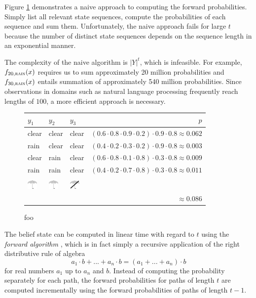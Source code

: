 Figure \ref{fw-naive-prob} demonstrates a naive
approach to computing the forward probabilities. Simply list all
relevant state sequences, compute the probabilities of each sequence
and sum them. Unfortunately, the naive approach fails for large
$t$ because the number of distinct state sequences depends on the sequence length in an exponential manner. 

The complexity of the naive algorithm is $|Y|^t$, which is infeasible.
For example, $f_{20,\textsc{rain}}(x)$ requires us to sum
approximately 20 million probabilities and $f_{30,\textsc{rain}}(x)$
entails summation of approximately 540 million probabilities. Since
observations in domains such as natural language processing frequently
reach lengths of $100$, a more efficient approach is necessary.

\begin{figure}[!ftb]
\begin{center}
\caption{foo}\label{fw-naive-prob}
\begin{tabular}{lllr}
$y_1$ & $y_2$ & $y_3$ & $p$ \\
\hline
{\sc clear} & {\sc clear} & {\sc clear} & $(0.6\cdot0.8\cdot0.9\cdot0.2)\cdot0.9\cdot0.8\approx0.062$\\
{\sc rain}  & {\sc clear} & {\sc clear} & $(0.4\cdot0.2\cdot0.3\cdot0.2)\cdot0.9\cdot0.8\approx0.003$\\
{\sc clear} & {\sc rain}  & {\sc clear} & $(0.6\cdot0.8\cdot0.1\cdot0.8)\cdot0.3\cdot0.8\approx0.009$\\
{\sc rain}  & {\sc rain}  & {\sc clear} & $(0.4\cdot0.2\cdot0.7\cdot0.8)\cdot0.3\cdot0.8\approx0.011$\\
& & & \\
\includegraphics[width=0.5cm]{umbrella} & \includegraphics[width=0.5cm]{umbrella} & \includegraphics[width=0.5cm]{no_umbrella} & \\
\hline
        &       & & $\approx0.086$
\end{tabular}
\end{center}
\end{figure}

The belief state can be computed in linear time with regard to $t$
using the {\it forward algorithm} \citep{Rabiner1989}, which is in
fact simply a recursive application of the right distributive rule of
algebra
$$a_1 \cdot b + ... + a_n \cdot b = (a_1 + ... + a_n)\cdot b$$
for real numbers $a_1$ up to $a_n$ and $b$. Instead of computing the
probability separately for each path, the forward probabilities for
paths of length $t$ are computed incrementally using the forward
probabilities of paths of length $t - 1$.

